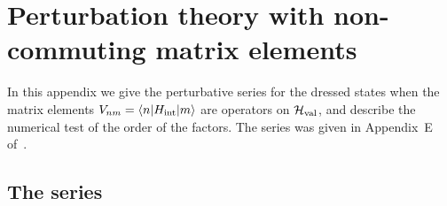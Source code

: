 \section{Perturbation theory with non-commuting matrix elements}\label{app:pt}

In this appendix we give the perturbative series for the dressed states when the matrix elements $V_{nm}=\braket{n|H_{\rm int}|m}$ are operators on $\mathcal H_{\rm val}$, and describe the numerical test of the order of the factors. The series was given in Appendix~E of~\cite{Lublinsky:2016meo}.

\subsection{The series}

